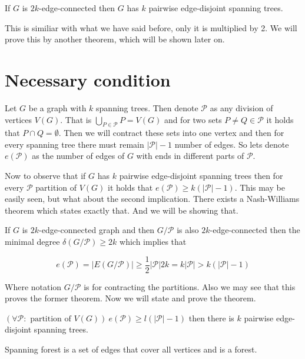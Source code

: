 \begin{thm}
	If $G$ is $2k$-edge-connected then $G$ has $k$ pairwise edge-disjoint spanning trees.
\end{thm}

This is similiar with what we have said before, only it is multiplied by 2. We will prove this by another theorem, which will be shown later on.

\section{Necessary condition}

Let $G$ be a graph with $k$ spanning trees. Then denote $\mathcal{P}$ as any division of vertices $V(G)$. That is $\bigcup_{P \in \mathcal{P}} P = V(G)$ and for two sets $P \neq Q \in \mathcal{P}$ it holds that $P \cap Q = \emptyset$. Then we will contract these sets into one vertex and then for every spanning tree there must remain $|\mathcal{P}| -1$ number of edges. So lets denote $e(\mathcal{P})$ as the number of edges of $G$ with ends in different parts of $\mathcal{P}$.

Now to observe that if $G$ has $k$ pairwise edge-disjoint spanning trees then for every $\mathcal{P}$ partition of $V(G)$ it holds that $e(\mathcal{P}) \geq k (|\mathcal{P}| - 1)$. This may be easily seen, but what about the second implication. There exists a Nash-Williams theorem which states exactly that. And we will be showing that.

\begin{observ}
	If $G$ is $2k$-edge-connected graph and then $G/\mathcal{P}$ is also $2k$-edge-connected then the minimal degree $\delta(G/\mathcal{P}) \geq 2k$ which implies that
	
	$$
	e(\mathcal{P}) = |E(G/\mathcal{P})| \geq \frac{1}{2} |\mathcal{P}| 2k = k |\mathcal{P}| > k (|\mathcal{P}| - 1)
	$$
\end{observ}

Where notation $G / \mathcal{P}$ is for contracting the partitions. Also we may see that this proves the former theorem. Now we will state and prove the theorem.

\begin{thm}
	$(\forall \mathcal{P} : \text{ partition of } V(G)) \ e(\mathcal{P}) \geq l (|\mathcal{P}| - 1)$ then there is $k$ pairwise edge-disjoint spanning trees.
\end{thm}

\begin{defn}
	Spanning forest is a set of edges that cover all vertices and is a forest.
\end{defn}

